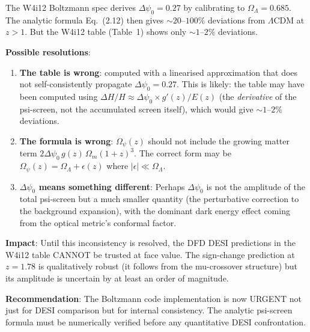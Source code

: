 \documentclass[11pt,a4paper]{article}
\newcounter{findingctr}
\newenvironment{finding}[1][]{%
  \refstepcounter{findingctr}%
  \begin{tcolorbox}[colback=blue!3!white, colframe=blue!50!black,
    title=\textbf{Finding \thefindingctr: #1}]
}{%
  \end{tcolorbox}%
}
\newcommand{\Omm}{\Omega_m}
\newcommand{\OmL}{\Omega_\Lambda}
\newcommand{\LCDM}{$\Lambda$CDM}
\begin{document}
\begin{finding}[\textbf{CRITICAL INCONSISTENCY}: W4i12 Table vs.\
  Analytic Formula Off by $\sim 50\times$]
\label{find:inconsistency}

The W4i12 Boltzmann spec derives $\Delta\psi_0 = 0.27$ by calibrating
to $\OmL = 0.685$.  The analytic formula
Eq.~(2.12) then gives $\sim 20$--$100\%$ deviations from \LCDM{} at
$z > 1$.  But the W4i12 table (Table~1) shows only $\sim 1$--$2\%$
deviations.

\textbf{Possible resolutions}:
\begin{enumerate}
\item \textbf{The table is wrong}: computed with a linearised
  approximation that does not self-consistently propagate $\Delta\psi_0
  = 0.27$.  This is likely: the table may have been computed using
  $\Delta H/H \approx \Delta\psi_0 \times g'(z) / E(z)$ (the
  \emph{derivative} of the psi-screen, not the accumulated screen
  itself), which would give $\sim 1$--$2\%$ deviations.

\item \textbf{The formula is wrong}: $\Omega_\psi(z)$ should not include
  the growing matter term $2\Delta\psi_0\,g(z)\,\Omm(1+z)^3$.
  The correct form may be
  $\Omega_\psi(z) = \OmL + \epsilon(z)$ where $|\epsilon| \ll \OmL$.

\item \textbf{$\Delta\psi_0$ means something different}: Perhaps
  $\Delta\psi_0$ is not the amplitude of the total psi-screen but
  a much smaller quantity (the perturbative correction to the background
  expansion), with the dominant dark energy effect coming from the
  optical metric's conformal factor.
\end{enumerate}

\textbf{Impact}: Until this inconsistency is resolved, the DFD DESI
predictions in the W4i12 table CANNOT be trusted at face value.
The sign-change prediction at $z = 1.78$ is qualitatively robust
(it follows from the mu-crossover structure) but its amplitude is
uncertain by at least an order of magnitude.

\textbf{Recommendation}: The Boltzmann code implementation is now
URGENT not just for DESI comparison but for internal consistency.
The analytic psi-screen formula must be numerically verified before
any quantitative DESI confrontation.

\end{finding}


\end{document}
